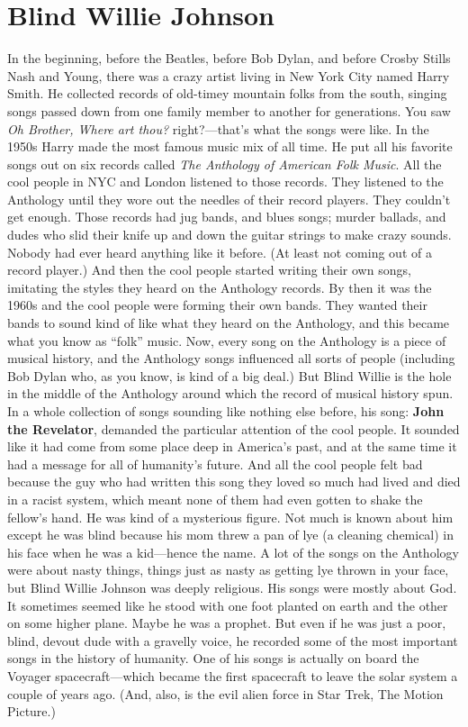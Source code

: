 \documentclass[letterpaper,single]{article}
\begin{document}
\section{Blind Willie Johnson}
In the beginning, before the Beatles, before Bob Dylan, and before
Crosby Stills Nash and Young, there was a crazy artist living in New
York City named Harry Smith. He collected records of old-timey mountain
folks from the south, singing songs passed down from one family member
to another for generations. You saw \emph{Oh Brother, Where art thou?}
right?---that's what the songs were like. In the 1950s Harry made the
most famous music mix of all time. He put all his favorite songs out
on six records called \emph{The Anthology of American Folk Music}.
All the cool people in NYC and London listened to those records. They
listened to the Anthology until they wore out the needles of their
record players. They couldn't get enough. Those records had jug bands,
and blues songs; murder ballads, and dudes who slid their knife up and
down the guitar strings to make crazy sounds. Nobody had ever heard
anything like it before. (At least not coming out of a record player.)
And then the cool people started writing their own songs, imitating the
styles they heard on the Anthology records. By then it was the 1960s
and the cool people were forming their own bands. They wanted their
bands to sound kind of like what they heard on the Anthology, and this
became what you know as ``folk'' music. Now, every song on the Anthology
is a piece of musical history, and the Anthology songs influenced all
sorts of people (including Bob Dylan who, as you know, is kind of a
big deal.) But Blind Willie is the hole in the middle of the Anthology
around which the record of musical history spun. In a whole collection
of songs sounding like nothing else before, his song: \textbf{John
the Revelator}, demanded the particular attention of the cool people.
It sounded like it had come from some place deep in America's past,
and at the same time it had a message for all of humanity's future.
And all the cool people felt bad because the guy who had written this
song they loved so much had lived and died in a racist system, which
meant none of them had even gotten to shake the fellow's hand. He was
kind of a mysterious figure. Not much is known about him except he was
blind because his mom threw a pan of lye (a cleaning chemical) in his
face when he was a kid---hence the name. A lot of the songs on the
Anthology were about nasty things, things just as nasty as getting lye
thrown in your face, but Blind Willie Johnson was deeply religious. His
songs were mostly about God. It sometimes seemed like he stood with
one foot planted on earth and the other on some higher plane. Maybe he
was a prophet. But even if he was just a poor, blind, devout dude with
a gravelly voice, he recorded some of the most important songs in the
history of humanity. One of his songs is actually on board the Voyager
spacecraft---which became the first spacecraft to leave the solar system
a couple of years ago. (And, also, is the evil alien force in Star Trek,
The Motion Picture.)
\end{document}
